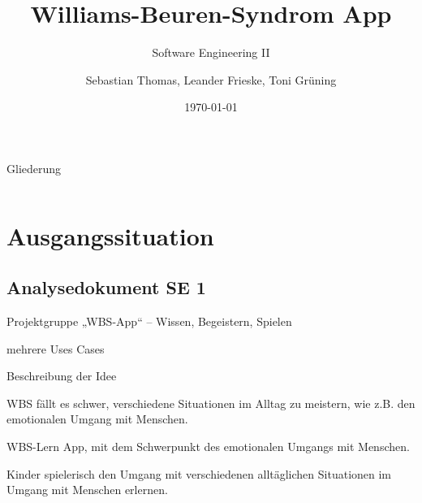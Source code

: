 \documentclass[10pt,fleqn]{beamer}
\title[WBS]{Williams-Beuren-Syndrom App}
\subtitle[]{Software Engineering II}
\date{\today}
\author{Sebastian Thomas, Leander Frieske, Toni Grüning}
\begin{document}

\begin{frame}
	\titlepage
\end{frame}

\begin{frame}{Gliederung}
 	\begin{columns}
   		\begin{column}{6.0cm}
		    \renewcommand{\baselinestretch}{1.5}
		    \normalsize
		    \tableofcontents
		    \renewcommand{\baselinestretch}{1.0}
		    \normalsize
	   	\end{column}
	   	\hspace*{-1.3cm}
	\end{columns}
\end{frame}


\section{Ausgangssituation}


\subsection{Analysedokument SE 1}
\begin{frame}[t]{Projektgruppe}
„WBS-App“ – Wissen, Begeistern, Spielen

mehrere Uses Cases

Beschreibung der Idee

WBS fällt es schwer, verschiedene Situationen im Alltag zu meistern,
wie z.B. den emotionalen Umgang mit Menschen.

WBS-Lern App, mit dem
Schwerpunkt des emotionalen Umgangs mit Menschen.

Kinder spielerisch den Umgang mit verschiedenen alltäglichen Situationen im Umgang
mit Menschen erlernen.
\end{frame} 
\end{document}
